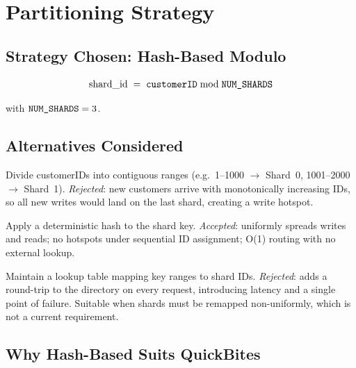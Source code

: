 \documentclass[12pt, a4paper]{article}
\renewcommand{\_}{\plainunderscore\allowbreak}
\begin{document}
\section{Partitioning Strategy}

\subsection{Strategy Chosen: Hash-Based Modulo}

\[
  \text{shard\_id} \;=\; \texttt{customerID} \bmod \texttt{NUM\_SHARDS}
\]

with $\texttt{NUM\_SHARDS} = 3$.

\subsection{Alternatives Considered}

\begin{description}[leftmargin=2.2cm, style=nextline]
  \item[Range-based]
    Divide customerIDs into contiguous ranges
    (e.g.\ 1--1000 $\to$ Shard~0, 1001--2000 $\to$ Shard~1).
    \emph{Rejected}: new customers arrive with monotonically increasing IDs,
    so all new writes would land on the last shard, creating a write hotspot.

  \item[Hash-based (chosen)]
    Apply a deterministic hash to the shard key.
    \emph{Accepted}: uniformly spreads writes and reads; no hotspots under
    sequential ID assignment; O(1) routing with no external lookup.

  \item[Directory-based]
    Maintain a lookup table mapping key ranges to shard IDs.
    \emph{Rejected}: adds a round-trip to the directory on every request,
    introducing latency and a single point of failure. Suitable when shards
    must be remapped non-uniformly, which is not a current requirement.
\end{description}

\subsection{Why Hash-Based Suits QuickBites}
\end{document}
